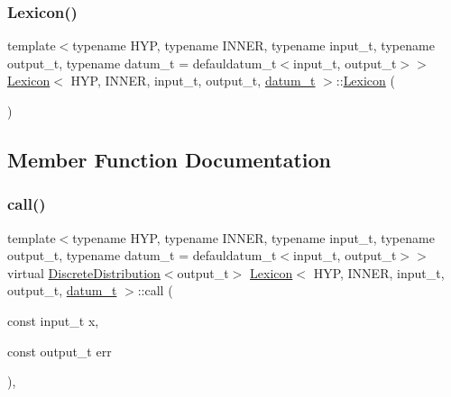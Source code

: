 \mbox{\label{class_lexicon_ab027c90715b8616af424c6682cdfef0f}} 
\subsubsection{\texorpdfstring{Lexicon()}{Lexicon()}\hspace{0.1cm}{\footnotesize\ttfamily [2/2]}}
{\footnotesize\ttfamily template$<$typename H\+YP, typename I\+N\+N\+ER, typename input\+\_\+t, typename output\+\_\+t, typename datum\+\_\+t = defauldatum\+\_\+t$<$input\+\_\+t, output\+\_\+t$>$$>$ \\
\hyperlink{class_lexicon}{Lexicon}$<$ H\+YP, I\+N\+N\+ER, input\+\_\+t, output\+\_\+t, \hyperlink{class_bayesable_a9f1a6c0cd7855550fa10b1a8f13a5867}{datum\+\_\+t} $>$\+::\hyperlink{class_lexicon}{Lexicon} (\begin{DoxyParamCaption}{ }\end{DoxyParamCaption})\hspace{0.3cm}{\ttfamily [inline]}}



\subsection{Member Function Documentation}
\mbox{\label{class_lexicon_afc6b762f68c6033a501ce7ca04b01ece}} 
\subsubsection{\texorpdfstring{call()}{call()}}
{\footnotesize\ttfamily template$<$typename H\+YP, typename I\+N\+N\+ER, typename input\+\_\+t, typename output\+\_\+t, typename datum\+\_\+t = defauldatum\+\_\+t$<$input\+\_\+t, output\+\_\+t$>$$>$ \\
virtual \hyperlink{class_discrete_distribution}{Discrete\+Distribution}$<$output\+\_\+t$>$ \hyperlink{class_lexicon}{Lexicon}$<$ H\+YP, I\+N\+N\+ER, input\+\_\+t, output\+\_\+t, \hyperlink{class_bayesable_a9f1a6c0cd7855550fa10b1a8f13a5867}{datum\+\_\+t} $>$\+::call (\begin{DoxyParamCaption}\item[{const input\+\_\+t}]{x,  }\item[{const output\+\_\+t}]{err }\end{DoxyParamCaption})\hspace{0.3cm}{\ttfamily [inline]}, {\ttfamily [virtual]}}



